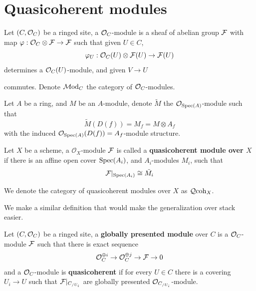 \section{Quasicoherent modules}\label{sec:algebraicgeometry-quasicoherentmodules}

\begin{definition}
    Let $(C, \mathcal{O}_C)$ be a ringed site, a $\mathcal{O}_C$-module is a sheaf of abelian group $\mathcal{F}$ with map $\varphi:\mathcal{O}_C \otimes \mathcal{F} \to \mathcal{F}$ such that given  $U \in C$,
    \[
   \varphi_U: \mathcal{O}_C(U)\otimes \mathcal{F}(U)\to \mathcal{F}(U)
    \]determines a $\mathcal{O}_C(U)$-module, and given $V\to U$ 
    \begin{center}
    \end{center}commutes. Denote $\operatorname{\mathcal{M}od}_C$ the category of $\mathcal{O}_C$-modules. 
\end{definition}

\begin{definition}
    Let $A$ be a ring, and $M$ be an $A$-module, denote $\tilde{M}$ the $\mathcal{O}_{\operatorname{\mathrm{Spec}}(A)}$-module such that 
    \[
    \tilde{M}(D(f))=M_f=M\otimes A_f
    \]with the induced $\mathcal{O}_{\operatorname{\mathrm{Spec}}(A)}(D(f))=A_f$-module structure.
\end{definition}

\begin{definition}
    Let $X$ be a scheme, a $\mathcal{O}_X$-module $\mathcal{F}$ is called a \textbf{quasicoherent module over $X$} if there is an affine open cover $\operatorname{\mathrm{Spec}}(A_i)$, and $A_i$-modules $M_i$, such that 
    \[
    \mathcal{F}|_{\operatorname{\mathrm{Spec}}(A_i)}\cong \tilde{M_i}
    \]
\end{definition}

We denote the category of quasicoherent modules over $X$ as $\operatorname{\mathcal{Q}coh}_X$. 

We make a similar definition that would make the generalization over stack easier.

\begin{definition}
    Let $(C, \mathcal{O}_C)$ be a ringed site, a \textbf{globally presented module} over $C$ is a $\mathcal{O}_C$-module $\mathcal{F}$ such that there is exact sequence
    \[
    \mathcal{O}_C^{\oplus i}\to \mathcal{O}_{C}^{\oplus j}\to \mathcal{F}\to 0
    \]and a $\mathcal{O}_C$-module is \textbf{quasicoherent} if for every $U\in C$ there is a covering $U_i\to U$ such that $\mathcal{F}|_{C_{/U_i}}$ are globally presented $\mathcal{O}_{C_{/U_i}}$-module. 
\end{definition}

